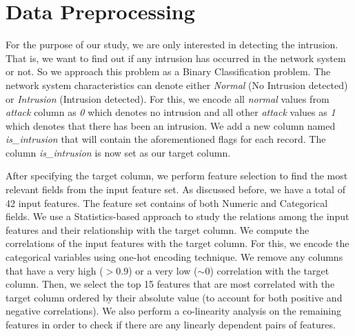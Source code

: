 \documentclass[conference]{IEEEtran}
\begin{document}
\section{Data Preprocessing}
For the purpose of our study, we are only interested in detecting the intrusion. That is, we want to find out if any intrusion has occurred in the network system or not. So we approach this problem as a Binary Classification problem. The network system characteristics can denote either \emph{Normal} (No Intrusion detected) or \emph{Intrusion} (Intrusion detected). For this, we encode all \emph{normal} values from \emph{attack} column as \emph{0} which denotes no intrusion and all other \emph{attack} values as \emph{1} which denotes that there has been an intrusion. We add a new column named \emph{is\_intrusion} that will contain the aforementioned flags for each record. The column \emph{is\_intrusion} is now set as our target column.

After specifying the target column, we perform feature selection to find the most relevant fields from the input feature set. As discussed before, we have a total of 42 input features. The feature set contains of both Numeric and Categorical fields. We use a Statistics-based approach to study the relations among the input features and their relationship with the target column. We compute the correlations of the input features with the target column. For this, we encode the categorical variables using one-hot encoding technique. We remove any columns that have a very high ($>0.9$) or a very low ($\sim 0$) correlation with the target column. Then, we select the top 15 features that are most correlated with the target column ordered by their absolute value (to account for both positive and negative correlations). We also perform a co-linearity analysis on the remaining features in order to check if there are any linearly dependent pairs of features.
\end{document}
